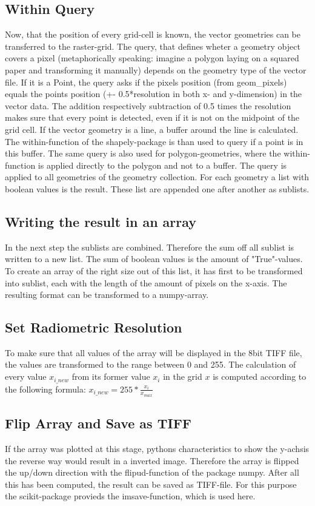 \documentclass[10pt, a4paper]{article}
\begin{document}
\subsection{Within Query}
Now, that the position of every grid-cell is known, the vector geometries can be transferred to the raster-grid. The query, that defines wheter a geometry object covers a pixel (metaphorically speaking: imagine a polygon laying on a squared paper and transforming it manually) depends on the geometry type of the vector file. 
If it is a Point, the query asks if the pixels position (from geom\_pixels) equals the points position (+- 0.5*resolution in both x- and y-dimension) in the vector data. The addition respectively subtraction of 0.5 times the resolution makes sure that every point is detected, even if it is not on the midpoint of the grid cell. 
If the vector geometry is a line, a buffer around the line is calculated. The within-function of the shapely-package is than used to query if a point is in this buffer. The same query is also used for polygon-geometries, where the within-function is applied directly to the polygon and not to a buffer.
The query is applied to all geometries of the geometry collection. For each geometry a list with boolean values is the result. These list are appended one after another as sublists.

\subsection{Writing the result in an array}
In the next step the sublists are combined. Therefore the sum off all sublist is written to a new list. The sum of boolean values is the amount of "True"-values.  To create an array of the right size out of this list, it has first to be transformed into sublist, each with the length of the amount of pixels on the x-axis. The resulting format can be transformed to a numpy-array.

\subsection{Set Radiometric Resolution}
To make sure that all values of the array will be displayed in the 8bit TIFF file, the values are transformed to the range between 0 and 255. The calculation of every value $x_{i\_new}$ from its former value $x_i$ in the grid $x$ is computed according to the following formula:
$ x_{i\_new} = 255 * \frac{x_i}{x_{max}} $

\subsection{Flip Array and Save as TIFF}
If the array was plotted at this stage, pythons characteristics to show the y-achsis the reverse way would result in a inverted image. Therefore the array is flipped the up/down direction with the flipud-function of the package numpy.
After all this has been computed, the result can be saved as TIFF-file. For this purpose the scikit-package provieds the imsave-function, which is used here.
\end{document}

